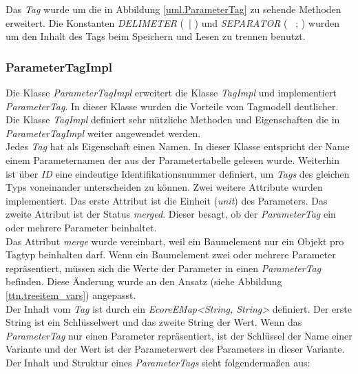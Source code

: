 Das \textit{Tag} wurde um die in Abbildung \ref{uml.ParameterTag} zu sehende Methoden erweitert. Die Konstanten \textit{DELIMETER} (\glqq~| \grqq) und \textit{SEPARATOR} (\glqq~ ; \grqq) wurden um den Inhalt des Tags beim Speichern und Lesen zu trennen benutzt.

\subsubsection{ParameterTagImpl}
Die Klasse \textit{ParameterTagImpl} erweitert die Klasse \textit{TagImpl} und implementiert \textit{ParameterTag}. In dieser Klasse wurden die Vorteile vom Tagmodell deutlicher. Die Klasse \textit{TagImpl} definiert sehr nützliche Methoden und Eigenschaften die in \textit{ParameterTagImpl} weiter angewendet werden.\\


Jedes \textit{Tag} hat als Eigenschaft einen Namen. In dieser Klasse entspricht der Name einem Parameternamen der aus der Parametertabelle gelesen wurde. Weiterhin ist über \textit{ID} eine eindeutige Identifikationsnummer definiert, um \textit{Tags} des gleichen Typs voneinander unterscheiden zu können. Zwei weitere Attribute wurden  implementiert. Das erste Attribut ist die Einheit (\textit{unit}) des Parameters. Das zweite Attribut ist der Status \textit{merged}. Dieser besagt, ob der \textit{ParameterTag} ein oder mehrere Parameter beinhaltet. \\


Das Attribut \textit{merge} wurde vereinbart, weil ein Baumelement nur ein Objekt pro Tagtyp beinhalten darf. Wenn ein Baumelement zwei oder mehrere Parameter repräsentiert, müssen sich die Werte der Parameter in einen \textit{ParameterTag} befinden. Diese Änderung wurde an den Ansatz (siehe Abbildung \ref{ttn.treeitem_vars}) angepasst.\\


Der Inhalt vom \textit{Tag} ist durch ein \textit{EcoreEMap<String, String>} definiert. Der erste String ist ein Schlüsselwert und das zweite String der Wert. Wenn das \textit{ParameterTag} nur einen Parameter repräsentiert, ist der Schlüssel der Name einer Variante und der Wert ist der Parameterwert des Parameters in dieser Variante. Der Inhalt und Struktur eines \textit{ParameterTags} sieht folgendermaßen aus:\\

